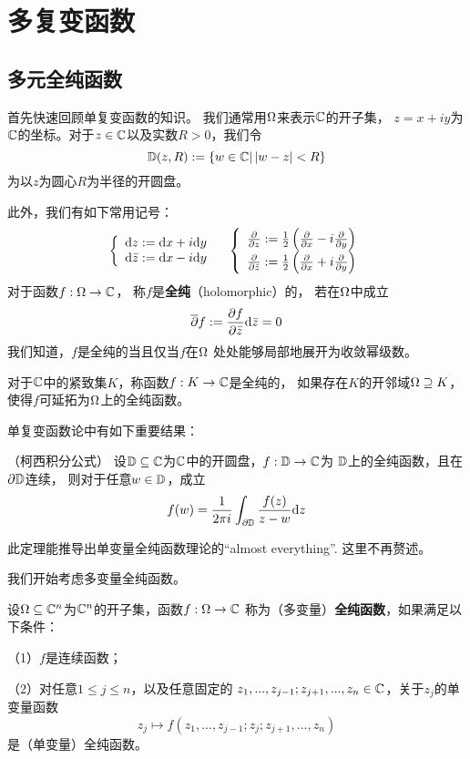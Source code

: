 \chapter{多复变函数}

\section{多元全纯函数}
首先快速回顾单复变函数的知识。
我们通常用$\Omega$来表示$\mathbb{C}$的开子集，
$z=x+iy$为$\mathbb{C}$的坐标。对于$z\in\mathbb{C}$以及实数$R>0$，我们令
$$\mathbb{D}(z,R):=\{w\in\mathbb{C}|\,|w-z|< R\}$$
为以$z$为圆心$R$为半径的开圆盘。

此外，我们有如下常用记号：
$$\left\{\begin{array}{l}
\mathrm{d} z:=\mathrm{d} x + i\mathrm{d} y\\
\mathrm{d} \bar{z} := \mathrm{d} x- i\mathrm{d} y
\end{array}\right.\quad
\left\{\begin{array}{l}
\frac{\partial } {\partial z}:=\frac{1}{2}
\left(\frac{\partial } {\partial x}-i\frac{\partial } {\partial y}\right)\\
\frac{\partial } {\partial \bar{z}} := \frac{1}{2}
\left(\frac{\partial } {\partial x}+i\frac{\partial } {\partial y}\right)
\end{array}\right.
$$
对于函数$f:\Omega\to\mathbb{C}$，
称$f$是\textbf{全纯}（holomorphic）的，
若在$\Omega$中成立
$$\overline{\partial} f:=\frac{\partial f} {\partial \bar{z}}\mathrm{d}\bar{z}=0$$
我们知道，$f$是全纯的当且仅当$f$在$\Omega$
处处能够局部地展开为收敛幂级数。

对于$\mathbb{C}$中的紧致集$K$，称函数$f:K\to\mathbb{C}$是全纯的，
如果存在$K$的开邻域$\Omega\supseteq K$，
使得$f$可延拓为$\Omega$上的全纯函数。

单复变函数论中有如下重要结果：

\begin{thm}（柯西积分公式）
设$\mathbb{D}\subseteq\mathbb{C}$为$\mathbb{C}$中的开圆盘，$f:\mathbb{D}\to\mathbb{C}$为
$\mathbb{D}$上的全纯函数，且在$\partial\mathbb{D}$连续，
则对于任意$w\in\mathbb{D}$，成立
$$f(w)=\frac{1}{2\pi i}\int_{\partial\mathbb{D}}\frac{f(z)}{z-w}\mathrm{d} z$$
\end{thm}

此定理能推导出单变量全纯函数理论的“almost everything”.
这里不再赘述。

我们开始考虑多变量全纯函数。

\begin{definition}
设$\Omega\subseteq\mathbb{C}^n$为$\mathbb{C}^n$的开子集，函数$f:\Omega\to\mathbb{C}$
称为（多变量）\textbf{全纯函数}，如果满足以下条件：

（1）$f$是连续函数；

（2）对任意$1\leq j\leq n$，以及任意固定的
$z_1,...,z_{j-1};z_{j+1},...,z_n\in\mathbb{C}$，关于$z_j$的单变量函数
$$z_j\mapsto f(z_1,...,z_{j-1};z_j;z_{j+1},...,z_n)$$
是（单变量）全纯函数。
\end{definition}

